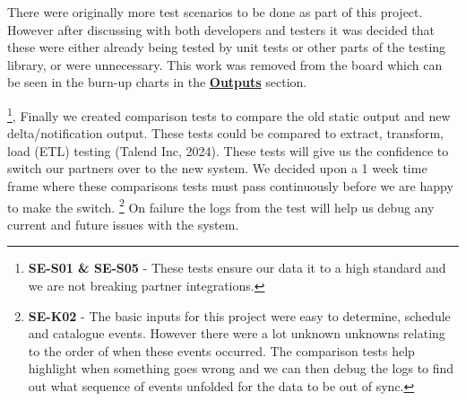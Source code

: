   There were originally more test scenarios to be done as part of this project. However after discussing with both developers and testers it was decided 
  that these were either already being tested by unit tests or other parts of the testing library, or were unnecessary. This work was removed from 
  the board which can be seen in the burn-up charts in the \hyperref[sec:burnup]{\textbf{Outputs}} section.

  \footnote{\textbf{SE-S01 \& SE-S05} - These tests ensure our data it to a high standard and we are not breaking partner integrations.}, 
  Finally we created comparison tests to compare the old static output and new delta/notification output. These tests could be compared to extract, transform, 
  load (ETL) testing (Talend Inc, 2024). These tests will give us the confidence to switch our partners over to the new system. We decided upon a 1 week time 
  frame where these comparisons tests must pass continuously before we are happy to make the switch. 
  \footnote{\textbf{SE-K02} - The basic inputs for this project were easy to determine, schedule and catalogue events. However there were a lot unknown unknowns 
  relating to the order of when these events occurred. The comparison tests help highlight when something goes wrong and we can then debug the logs to 
  find out what sequence of events unfolded for the data to be out of sync.}
  On failure the logs from the test will help us debug any current and future issues with the system.

  \newpage